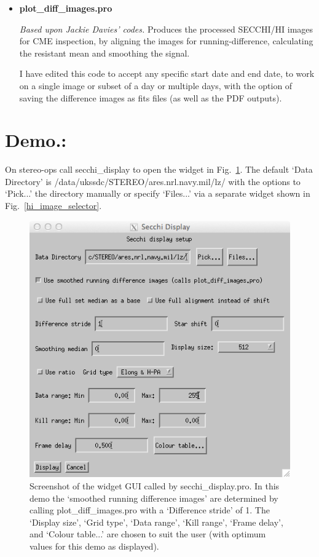 \documentclass[12pt, a4paper, oneside]{article}
\begin{document}
\begin{itemize}
\begin{multicols}{3}
\begin{itemize}
\end{itemize}
\end{multicols}
\item {\bf plot\_diff\_images.pro}

\textit{Based upon Jackie Davies' codes.} Produces the processed SECCHI/HI images for CME inspection, by aligning the images for running-difference, calculating the resistant mean and smoothing the signal.

I have edited this code to accept any specific start date and end date, to work on a single image or subset of a day or multiple days, with the option of saving the difference images as fits files (as well as the PDF outputs). 

\end{itemize}

\vskip 0.1in

\section{Demo.:}


On stereo-ops call secchi\_display to open the widget in Fig.~\ref{secchi_display}. The default `Data Directory' is /data/ukssdc/STEREO/ares.nrl.navy.mil/lz/ with the options to `Pick...' the directory manually or specify `Files...' via a separate widget shown in Fig.~\ref{hi_image_selector}.

\begin{figure}[]
\centering
\includegraphics[scale=0.8, trim=0 0 0 0, clip=true]{../images/secchi_display.png}
\caption{Screenshot of the widget GUI called by secchi\_display.pro. In this demo the `smoothed running difference images' are determined by calling plot\_diff\_images.pro with a `Difference stride' of 1. The `Display size', `Grid type', `Data range', `Kill range', `Frame delay', and `Colour table...' are chosen to suit the user (with optimum values for this demo as displayed).}
\label{secchi_display}
\end{figure}
\end{document}
